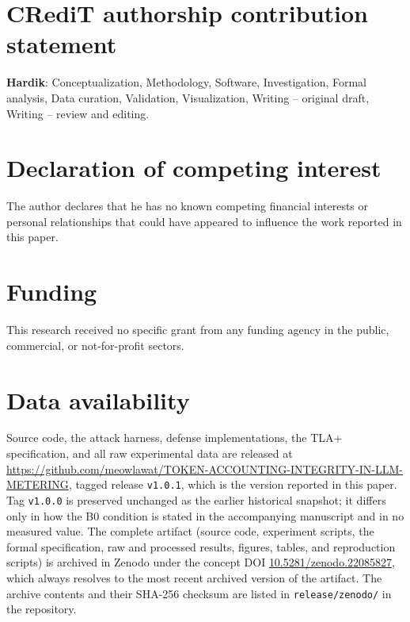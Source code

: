 \documentclass[preprint,3p,authoryear,12pt]{elsarticle}
\begin{document}
\section*{CRediT authorship contribution statement}
\textbf{Hardik}: Conceptualization, Methodology, Software, Investigation, Formal
analysis, Data curation, Validation, Visualization, Writing -- original draft, Writing --
review and editing.

\section*{Declaration of competing interest}
The author declares that he has no known competing financial interests or personal
relationships that could have appeared to influence the work reported in this paper.

\section*{Funding}
This research received no specific grant from any funding agency in the public,
commercial, or not-for-profit sectors.

\section*{Data availability}
Source code, the attack harness, defense implementations, the TLA+ specification, and all
raw experimental data are released at
\url{https://github.com/meowlawat/TOKEN-ACCOUNTING-INTEGRITY-IN-LLM-METERING}, tagged
release \texttt{v1.0.1}, which is the version reported in this paper. Tag
\texttt{v1.0.0} is preserved unchanged as the earlier historical snapshot; it differs only
in how the B0 condition is stated in the accompanying manuscript and in no measured value.
The complete artifact (source code, experiment scripts, the formal
specification, raw and processed results, figures, tables, and reproduction scripts)
is archived in Zenodo under the concept DOI
\href{https://doi.org/10.5281/zenodo.22085827}{10.5281/zenodo.22085827}, which always
resolves to the most recent archived version of the artifact. The archive contents and their SHA-256 checksum are listed in
\texttt{release/zenodo/} in the repository.
\end{document}
